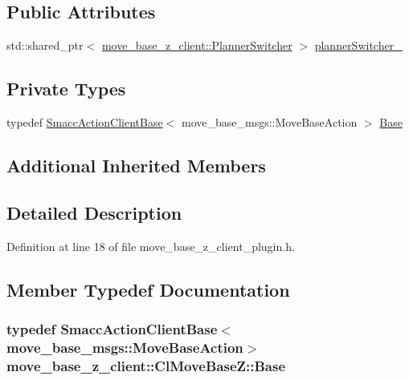 \subsection*{Public Attributes}
\begin{DoxyCompactItemize}
\item 
std\+::shared\+\_\+ptr$<$ \hyperlink{classmove__base__z__client_1_1PlannerSwitcher}{move\+\_\+base\+\_\+z\+\_\+client\+::\+Planner\+Switcher} $>$ \hyperlink{classmove__base__z__client_1_1ClMoveBaseZ_ac57d2293bc0a5c4fcef326379822cc5e}{planner\+Switcher\+\_\+}
\end{DoxyCompactItemize}
\subsection*{Private Types}
\begin{DoxyCompactItemize}
\item 
typedef \hyperlink{classsmacc_1_1client__bases_1_1SmaccActionClientBase_a942113f29871c3e2c3fff9e951500805}{Smacc\+Action\+Client\+Base}$<$ move\+\_\+base\+\_\+msgs\+::\+Move\+Base\+Action $>$ \hyperlink{classmove__base__z__client_1_1ClMoveBaseZ_a5446f4fb56caf7c8de8dd3bd34ae64d6}{Base}
\end{DoxyCompactItemize}
\subsection*{Additional Inherited Members}


\subsection{Detailed Description}


Definition at line 18 of file move\+\_\+base\+\_\+z\+\_\+client\+\_\+plugin.\+h.



\subsection{Member Typedef Documentation}
\subsubsection[{\texorpdfstring{Base}{Base}}]{\setlength{\rightskip}{0pt plus 5cm}typedef {\bf Smacc\+Action\+Client\+Base}$<$move\+\_\+base\+\_\+msgs\+::\+Move\+Base\+Action$>$ {\bf move\+\_\+base\+\_\+z\+\_\+client\+::\+Cl\+Move\+Base\+Z\+::\+Base}\hspace{0.3cm}{\ttfamily [private]}}\hypertarget{classmove__base__z__client_1_1ClMoveBaseZ_a5446f4fb56caf7c8de8dd3bd34ae64d6}{}\label{classmove__base__z__client_1_1ClMoveBaseZ_a5446f4fb56caf7c8de8dd3bd34ae64d6}


